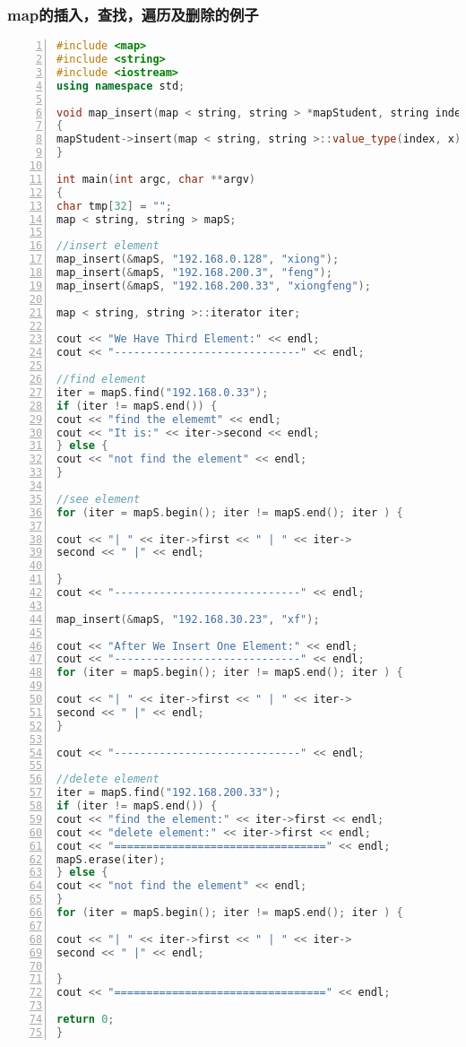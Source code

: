 \documentclass[11pt,a4paper,titlepage]{article}
\begin{document}
\subsubsection{\kai map的插入，查找，遍历及删除的例子}
\begin{lstlisting}[language=C++, numbers=left]
#include <map>
#include <string>
#include <iostream>
using namespace std;

void map_insert(map < string, string > *mapStudent, string index, string x)
{
mapStudent->insert(map < string, string >::value_type(index, x));
}

int main(int argc, char **argv)
{
char tmp[32] = "";
map < string, string > mapS;

//insert element
map_insert(&mapS, "192.168.0.128", "xiong");
map_insert(&mapS, "192.168.200.3", "feng");
map_insert(&mapS, "192.168.200.33", "xiongfeng");

map < string, string >::iterator iter;

cout << "We Have Third Element:" << endl;
cout << "-----------------------------" << endl;

//find element
iter = mapS.find("192.168.0.33");
if (iter != mapS.end()) {
cout << "find the elememt" << endl;
cout << "It is:" << iter->second << endl;
} else {
cout << "not find the element" << endl;
}

//see element
for (iter = mapS.begin(); iter != mapS.end(); iter ) {

cout << "| " << iter->first << " | " << iter->
second << " |" << endl;

}
cout << "-----------------------------" << endl;

map_insert(&mapS, "192.168.30.23", "xf");

cout << "After We Insert One Element:" << endl;
cout << "-----------------------------" << endl;
for (iter = mapS.begin(); iter != mapS.end(); iter ) {

cout << "| " << iter->first << " | " << iter->
second << " |" << endl;
}

cout << "-----------------------------" << endl;

//delete element
iter = mapS.find("192.168.200.33");
if (iter != mapS.end()) {
cout << "find the element:" << iter->first << endl;
cout << "delete element:" << iter->first << endl;
cout << "=================================" << endl;
mapS.erase(iter);
} else {
cout << "not find the element" << endl;
}
for (iter = mapS.begin(); iter != mapS.end(); iter ) {

cout << "| " << iter->first << " | " << iter->
second << " |" << endl;

}
cout << "=================================" << endl;

return 0;
}
\end{lstlisting}
\end{document}
